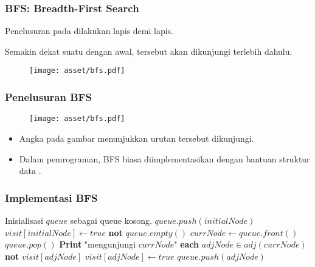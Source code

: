 \begin{frame}
\frametitle{BFS: Breadth-First Search}
Penelusuran \fnode pada \fgraph dilakukan lapis demi lapis. 

Semakin dekat suatu \fnode dengan \fnode awal, \fnode tersebut akan dikunjungi terlebih dahulu. 

\begin{figure}
  \centering
  \texttt{[image: asset/bfs.pdf]}
\end{figure}
\end{frame}

\begin{frame}
\frametitle{Penelusuran BFS}
\begin{figure}
  \centering
  \texttt{[image: asset/bfs.pdf]}
\end{figure}
\begin{itemize}
  \item Angka pada gambar menunjukkan urutan \fnode tersebut dikunjungi.
  \item Dalam pemrograman, BFS biasa diimplementasikan dengan bantuan struktur data .
\end{itemize}
\end{frame}

\begin{frame}[fragile]
\frametitle{Implementasi BFS}
%
%        
\begin{codebox}
  \li \Comment Inisialisasi $queue$ sebagai queue kosong.
  \li $queue.push(initialNode)$
  \li $visit[initialNode] \gets true$
  \li \While \textbf{not} $queue.empty()$ \Do
  \li   $currNode \gets queue.front()$
  \li   $queue.pop()$
  \li   \textbf{Print} "mengunjungi $currNode$"
  \li   \For \textbf{each} $adjNode \in adj(currNode)$ \Do
  \li     \If \textbf{not} $visit[adjNode]$ \Then
  \li       $visit[adjNode] \gets true$
  \li       $queue.push(adjNode)$
          \End
        \End
      \End
\end{codebox}
\end{frame}

